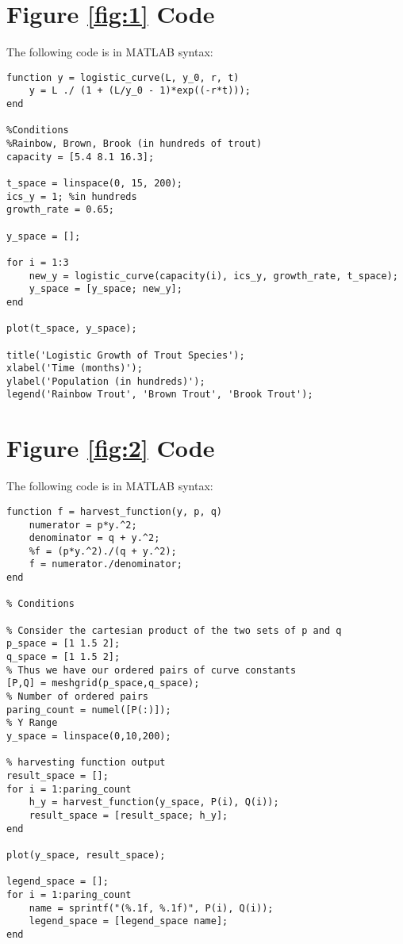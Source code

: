 \documentclass[letterpaper,12pt]{article}
\begin{document}
\begin{appendices}
\section{Figure \ref{fig:1} Code} \label{appendix:A}
The following code is in MATLAB syntax:
\begin{spacing}{1}
\begin{lstlisting}
function y = logistic_curve(L, y_0, r, t)
    y = L ./ (1 + (L/y_0 - 1)*exp((-r*t)));
end

%Conditions
%Rainbow, Brown, Brook (in hundreds of trout)
capacity = [5.4 8.1 16.3];

t_space = linspace(0, 15, 200);
ics_y = 1; %in hundreds
growth_rate = 0.65;

y_space = [];

for i = 1:3
    new_y = logistic_curve(capacity(i), ics_y, growth_rate, t_space);
    y_space = [y_space; new_y];
end

plot(t_space, y_space);

title('Logistic Growth of Trout Species');
xlabel('Time (months)');
ylabel('Population (in hundreds)');
legend('Rainbow Trout', 'Brown Trout', 'Brook Trout'); 
\end{lstlisting}
\end{spacing}
\newpage
\section{Figure \ref{fig:2} Code} \label{appendix:B}
The following code is in MATLAB syntax:
\begin{spacing}{1}
\begin{lstlisting}
function f = harvest_function(y, p, q)
    numerator = p*y.^2;
    denominator = q + y.^2;
    %f = (p*y.^2)./(q + y.^2);
    f = numerator./denominator;
end

% Conditions

% Consider the cartesian product of the two sets of p and q
p_space = [1 1.5 2];
q_space = [1 1.5 2];
% Thus we have our ordered pairs of curve constants
[P,Q] = meshgrid(p_space,q_space);
% Number of ordered pairs
paring_count = numel([P(:)]);
% Y Range
y_space = linspace(0,10,200);

% harvesting function output
result_space = [];
for i = 1:paring_count
    h_y = harvest_function(y_space, P(i), Q(i));
    result_space = [result_space; h_y];
end

plot(y_space, result_space);

legend_space = [];
for i = 1:paring_count
    name = sprintf("(%.1f, %.1f)", P(i), Q(i));
    legend_space = [legend_space name];
end


\end{lstlisting}
\end{spacing}
\end{appendices}
\end{document}
